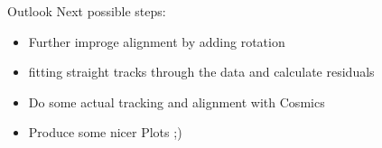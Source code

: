 \documentclass{beamer}
\begin{document}
\begin{frame}{Outlook}
    Next possible steps:
    \begin{itemize}
	\item Further improge alignment by adding rotation \pause
	\item fitting straight tracks through the data and calculate residuals \pause
	\item Do some actual tracking and alignment with Cosmics \pause
	\item Produce some nicer Plots ;) \pause
    \end{itemize}
\end{frame}
\end{document}
